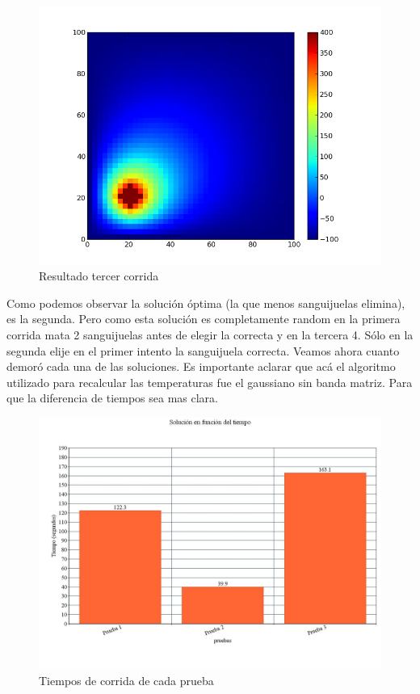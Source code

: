\begin{figure}[htb]
\begin{center}
\includegraphics[scale=0.50]{imagenes/random_3.png} 
\caption{Resultado tercer corrida} 
\end{center}
\end{figure}

Como podemos observar la solución óptima (la que menos sanguijuelas elimina), es la segunda. Pero como esta solución es completamente random en la primera corrida mata 2 sanguijuelas antes de elegir la correcta y en la tercera 4. Sólo en la segunda elije en el primer intento la sanguijuela correcta.
\newpage
Veamos ahora cuanto demoró cada una de las soluciones. Es importante aclarar que acá el algoritmo utilizado para recalcular las temperaturas fue el gaussiano sin banda matriz. Para que la diferencia de tiempos sea mas clara.


\begin{figure}[htb]
\begin{center}
\includegraphics[scale=0.30]{imagenes/random_tiempo.jpg} 
\caption{Tiempos de corrida de cada prueba} 
\end{center}
\end{figure}

